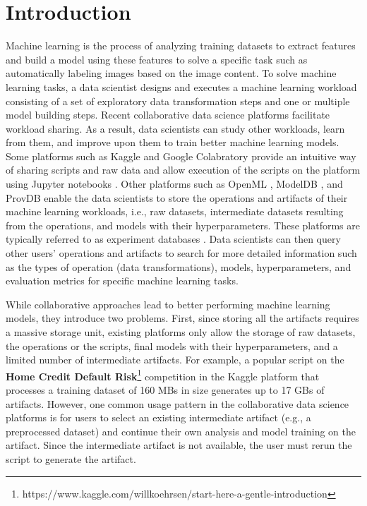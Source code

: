 \section{Introduction} \label{sec-introduction}
Machine learning is the process of analyzing training datasets to extract features and build a model using these features to solve a specific task such as automatically labeling images based on the image content.
To solve machine learning tasks, a data scientist designs and executes a machine learning workload consisting of a set of exploratory data transformation steps and one or multiple model building steps.
Recent collaborative data science platforms facilitate workload sharing.
As a result, data scientists can study other workloads, learn from them, and improve upon them to train better machine learning models.
Some platforms such as Kaggle \cite{kagglewebsite} and Google Colabratory \cite{googlecolab} provide an intuitive way of sharing scripts and raw data and allow execution of the scripts on the platform using Jupyter notebooks \cite{Kluyver:2016aa}. 
Other platforms such as OpenML \cite{vanschoren2014openml}, ModelDB \cite{vartak2016m}, and ProvDB \cite{miao2018provdb} enable the data scientists to store the operations and artifacts of their machine learning workloads, i.e., raw datasets, intermediate datasets resulting from the operations, and models with their hyperparameters.
These platforms are typically referred to as experiment databases \cite{Vanschoren2012}.
Data scientists can then query other users' operations and artifacts to search for more detailed information such as the types of operation (data transformations), models, hyperparameters, and evaluation metrics for specific machine learning tasks.

While collaborative approaches lead to better performing machine learning models, they introduce two problems.
First, since storing all the artifacts requires a massive storage unit, existing platforms only allow the storage of raw datasets, the operations or the scripts, final models with their hyperparameters, and a limited number of intermediate artifacts.
For example, a popular script on the \textbf{Home Credit Default Risk}\footnote{https://www.kaggle.com/willkoehrsen/start-here-a-gentle-introduction} competition in the Kaggle platform that processes a training dataset of 160 MBs in size generates up to 17 GBs of artifacts.
However, one common usage pattern in the collaborative data science platforms is for users to select an existing intermediate artifact (e.g., a preprocessed dataset) and continue their own analysis and model training on the artifact. 
Since the intermediate artifact is not available, the user must rerun the script to generate the artifact.

